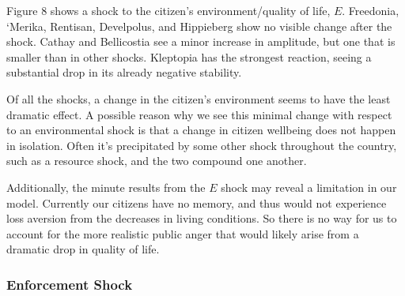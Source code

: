 \documentclass[12pt]{article}
\begin{document}
\begin{spacing}{1.5}
\begin{figure}
\end{figure}


Figure 8 shows a shock to the citizen's environment/quality of life, $E$. Freedonia, `Merika, Rentisan, Develpolus, and Hippieberg show no visible change after the shock. Cathay and Bellicostia see a minor increase in amplitude, but one that is smaller than in other shocks. Kleptopia has the strongest reaction, seeing a substantial drop in its already negative stability. 

Of all the shocks, a change in the citizen's environment seems to have the least dramatic effect. A possible reason why we see this minimal change with respect to an environmental shock is that a change in citizen wellbeing does not happen in isolation. Often it's precipitated by some other shock throughout the country, such as a resource shock, and the two compound one another. 

Additionally, the minute results from the $E$ shock may reveal a limitation in our model. Currently our citizens have no memory, and thus would not experience loss aversion from the decreases in living conditions. So there is no way for us to account for the more realistic public anger that would likely arise from a dramatic drop in quality of life. 

\subsubsection{Enforcement Shock}


\end{spacing}
\end{document}
